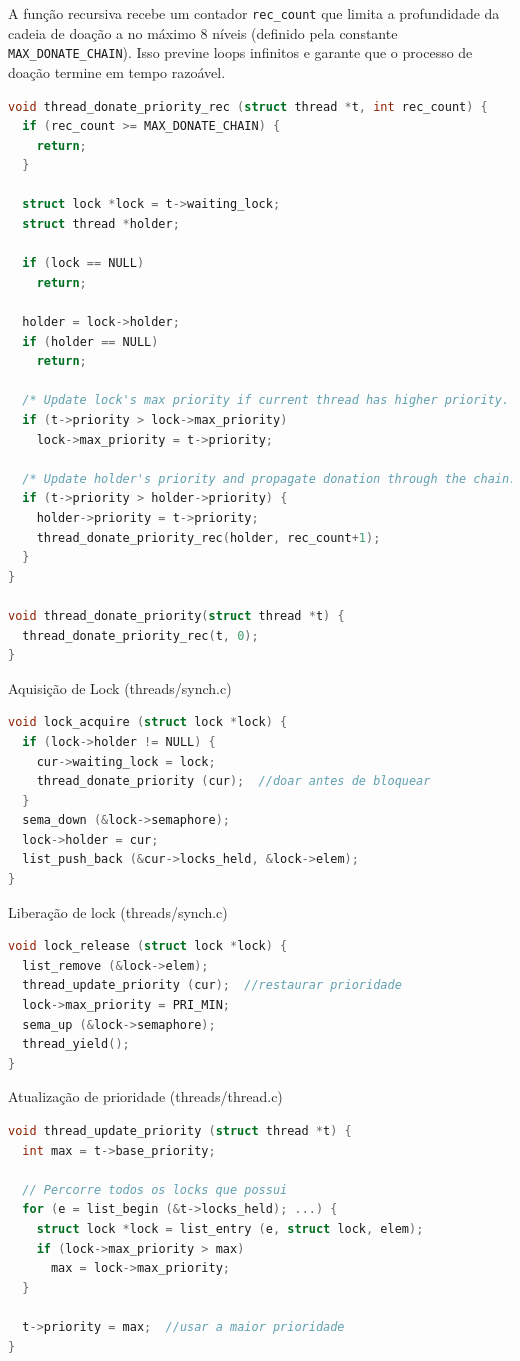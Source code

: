 \documentclass{article}
\begin{document}
A função recursiva recebe um contador \texttt{rec\_count} que limita a profundidade da cadeia de doação a no máximo 8 níveis (definido pela constante \texttt{MAX\_DONATE\_CHAIN}). Isso previne loops infinitos e garante que o processo de doação termine em tempo razoável.


\begin{lstlisting}[language=C]
void thread_donate_priority_rec (struct thread *t, int rec_count) {
  if (rec_count >= MAX_DONATE_CHAIN) {
    return;
  }
  
  struct lock *lock = t->waiting_lock;
  struct thread *holder;

  if (lock == NULL)
    return;

  holder = lock->holder;
  if (holder == NULL)
    return;

  /* Update lock's max priority if current thread has higher priority. */
  if (t->priority > lock->max_priority)
    lock->max_priority = t->priority;

  /* Update holder's priority and propagate donation through the chain. */
  if (t->priority > holder->priority) { 
    holder->priority = t->priority;
    thread_donate_priority_rec(holder, rec_count+1);
  }
}

void thread_donate_priority(struct thread *t) {
  thread_donate_priority_rec(t, 0);
}
\end{lstlisting}

\hfill \break

Aquisição de Lock (threads/synch.c)


\begin{lstlisting}[language=C]
void lock_acquire (struct lock *lock) {
  if (lock->holder != NULL) {
    cur->waiting_lock = lock;
    thread_donate_priority (cur);  //doar antes de bloquear
  }
  sema_down (&lock->semaphore);
  lock->holder = cur;
  list_push_back (&cur->locks_held, &lock->elem);
}
\end{lstlisting}

\hfill \break

Liberação de lock (threads/synch.c)

\begin{lstlisting}[language=C]
void lock_release (struct lock *lock) {
  list_remove (&lock->elem);
  thread_update_priority (cur);  //restaurar prioridade
  lock->max_priority = PRI_MIN;
  sema_up (&lock->semaphore);
  thread_yield();
}
\end{lstlisting}

\hfill \break

Atualização de prioridade (threads/thread.c)
\begin{lstlisting}[language=C]
void thread_update_priority (struct thread *t) {
  int max = t->base_priority;

  // Percorre todos os locks que possui
  for (e = list_begin (&t->locks_held); ...) {
    struct lock *lock = list_entry (e, struct lock, elem);
    if (lock->max_priority > max)
      max = lock->max_priority;
  }

  t->priority = max;  //usar a maior prioridade
}
\end{lstlisting}
\end{document}
